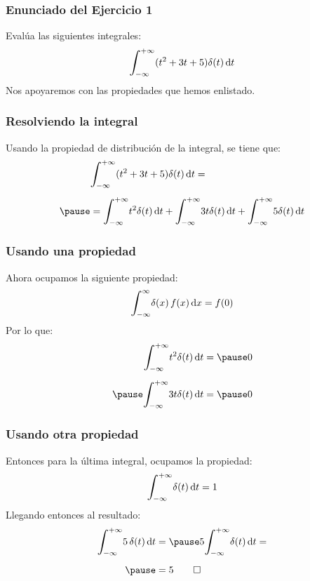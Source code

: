 \documentclass[12pt]{beamer}
\begin{document}
\begin{frame}
\frametitle{Enunciado del Ejercicio 1}
Evalúa las siguientes integrales:
\pause
\begin{align*}
\scaleint{6ex}_{\bs -\infty}^{+\infty} (t^{2} + 3 t + 5) \delta (t) \dd{t}
\end{align*}
\pause
Nos apoyaremos con las propiedades que hemos enlistado.
\end{frame}
\begin{frame}
\frametitle{Resolviendo la integral}
Usando la propiedad de distribución de la integral, se tiene que:
\pause
\begin{eqnarray*}
\begin{aligned}
&\scaleint{6ex}_{\bs -\infty}^{+\infty} (t^{2} + 3 t + 5) \delta (t) \dd{t} = \\[0.5em] \pause
&= \scaleint{6ex}_{\bs -\infty}^{+\infty} t^{2} \delta (t) \dd{t} + \scaleint{6ex}_{\bs -\infty}^{+\infty} 3 t \delta (t) \dd{t} + \scaleint{6ex}_{\bs -\infty}^{+\infty} 5 \delta (t) \dd{t}
\end{aligned}
\end{eqnarray*}
\end{frame}
\begin{frame}
\frametitle{Usando una propiedad}
Ahora ocupamos la siguiente propiedad:
\pause
\begin{align*}
\scaleint{6ex}_{\bs -\infty}^{\infty} \delta (x) \, f (x) \dd{x} = f (0)
\end{align*}
\pause
Por lo que:
\begin{eqnarray*}
\begin{aligned}
\scaleint{6ex}_{\bs -\infty}^{+\infty} t^{2} \delta (t) \dd{t} = \pause 0 \\[0.5em] \pause
\scaleint{6ex}_{\bs -\infty}^{+\infty} 3 t \delta (t) \dd{t} =  \pause 0
\end{aligned}
\end{eqnarray*}
\end{frame}
\begin{frame}
\frametitle{Usando otra propiedad}
Entonces para la última integral, ocupamos la propiedad:
\pause
\begin{align*}
\scaleint{6ex}_{\bs -\infty}^{+\infty} \delta (t) \dd{t} =  1
\end{align*}
\pause
Llegando entonces al resultado:
\begin{eqnarray*}
\begin{aligned}
\scaleint{6ex}_{\bs -\infty}^{+\infty} 5 \, \delta (t) \dd{t} &= \pause 5 \scaleint{6ex}_{\bs -\infty}^{+\infty} \delta (t) \dd{t} = \\[0.5em] \pause
&= 5 \qed
\end{aligned}
\end{eqnarray*}
\end{frame}
\end{document}
